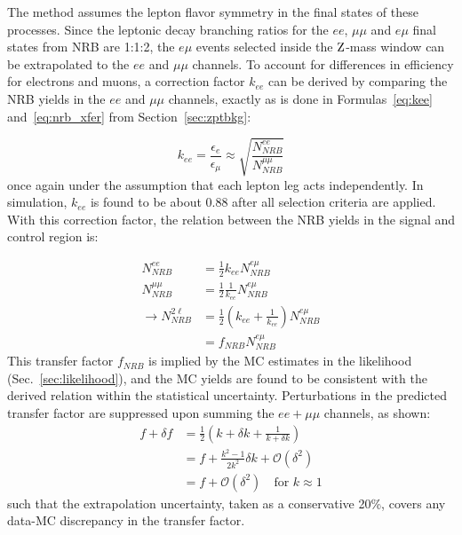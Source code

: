 The method assumes the lepton flavor symmetry in the final states of these processes.
Since the leptonic decay branching ratios for the $ee$, $\mu\mu$ and $e\mu$ final states from NRB are 1:1:2,
the $e\mu$ events selected inside the $\mathrm{Z}$-mass window can be extrapolated to the $ee$ and $\mu\mu$ channels.
To account for differences in efficiency for electrons and muons, a correction factor $k_{ee}$ can be derived
by comparing the NRB yields in the $ee$ and $\mu\mu$ channels,
exactly as is done in Formulas~\ref{eq:kee} and~\ref{eq:nrb_xfer} from Section~\ref{sec:zptbkg}:

\begin{equation}
k_{ee} = \frac{\epsilon_e}{\epsilon_{\mu}} \approx \sqrt{\frac{N^{ee}_{NRB}}{N^{\mu\mu}_{NRB}}}
\end{equation}
once again under the assumption that each lepton leg acts independently.
In simulation, $k_{ee}$ is found to be about $0.88$ after all selection criteria are applied.
With this correction factor, the relation between the NRB yields in the signal and control region is:

\begin{equation}
\begin{split}
  N^{ee}_{NRB}     &= \frac{1}{2} k_{ee} N^{e\mu}_{NRB} \\
  N^{\mu\mu}_{NRB} &= \frac{1}{2} \frac{1}{k_{ee}} N^{e\mu}_{NRB} \\
\rightarrow N^{2\ell}_{NRB}  &= \frac{1}{2} \left( k_{ee} + \frac{1}{k_{ee}} \right) N^{e\mu}_{NRB} \\
&= f_{NRB} N^{e\mu}_{NRB}
\end{split}
\end{equation}
This transfer factor $f_{NRB}$ is implied by the MC estimates in the likelihood (Sec.~\ref{sec:likelihood}),
and the MC yields are found to be consistent with the derived relation within the statistical uncertainty.
Perturbations in the predicted transfer factor are suppressed upon summing the $ee+\mu\mu$ channels, as shown:
\begin{equation}
\begin{split}
  f + \delta f &= \frac{1}{2} \left( k + \delta k + \frac{1}{k + \delta k} \right) \\
  &= f + \frac{k^2-1}{2k^2} \delta k + \mathcal{O}(\delta^2) \\
  &= f + \mathcal{O}(\delta^2) \quad \text{for } k \approx 1
\end{split}
\end{equation}
such that the extrapolation uncertainty, taken as a conservative 20\%, covers any data-MC discrepancy
in the transfer factor.


